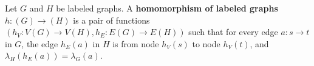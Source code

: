 
\begin{definition}
    \label{def:graph:homomorphism}
    Let \( G \) and \( H \) be labeled graphs. A \textbf{homomorphism of labeled graphs} $h:(G) \rightarrow (H)$ is a pair of functions $(h_V: V(G) \to V(H), h_E: E(G) \to E(H))$ such that for every edge \( a: s \to t \) in \( G \), the edge \( h_E(a) \) in $H$ is from node \( h_V(s) \) to node \( h_V(t) \), and \( \lambda_H(h_E(a)) = \lambda_G(a) \).
\end{definition}

